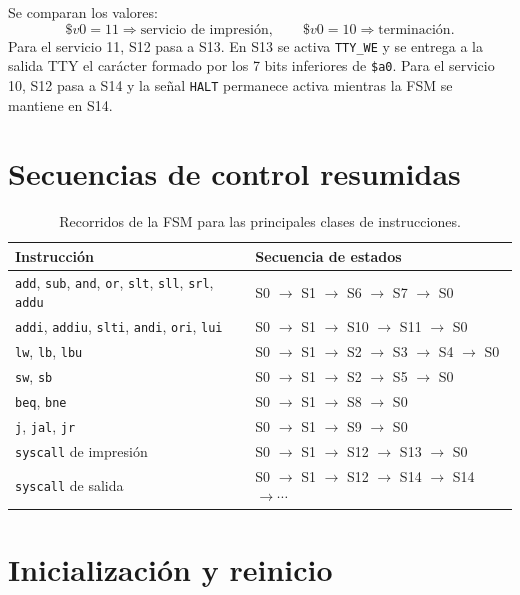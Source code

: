 \documentclass[11pt,a4paper]{article}
\begin{document}
Se comparan los valores:
\[
    \$v0=11 \Rightarrow \text{servicio de impresión},
    \qquad
    \$v0=10 \Rightarrow \text{terminación}.
\]
Para el servicio 11, S12 pasa a S13. En S13 se activa \texttt{TTY\_WE} y se entrega a la salida TTY el carácter formado por los 7 bits inferiores de \texttt{\$a0}. Para el servicio 10, S12 pasa a S14 y la señal \texttt{HALT} permanece activa mientras la FSM se mantiene en S14.

\section{Secuencias de control resumidas}

\begin{table}[H]
    \centering
    \begin{tabularx}{\textwidth}{lX}
        \toprule
        \textbf{Instrucción} & \textbf{Secuencia de estados} \\
        \midrule
        \texttt{add}, \texttt{sub}, \texttt{and}, \texttt{or}, \texttt{slt}, \texttt{sll}, \texttt{srl}, \texttt{addu} & S0 $\to$ S1 $\to$ S6 $\to$ S7 $\to$ S0 \\
        \texttt{addi}, \texttt{addiu}, \texttt{slti}, \texttt{andi}, \texttt{ori}, \texttt{lui} & S0 $\to$ S1 $\to$ S10 $\to$ S11 $\to$ S0 \\
        \texttt{lw}, \texttt{lb}, \texttt{lbu} & S0 $\to$ S1 $\to$ S2 $\to$ S3 $\to$ S4 $\to$ S0 \\
        \texttt{sw}, \texttt{sb} & S0 $\to$ S1 $\to$ S2 $\to$ S5 $\to$ S0 \\
        \texttt{beq}, \texttt{bne} & S0 $\to$ S1 $\to$ S8 $\to$ S0 \\
        \texttt{j}, \texttt{jal}, \texttt{jr} & S0 $\to$ S1 $\to$ S9 $\to$ S0 \\
        \texttt{syscall} de impresión & S0 $\to$ S1 $\to$ S12 $\to$ S13 $\to$ S0 \\
        \texttt{syscall} de salida & S0 $\to$ S1 $\to$ S12 $\to$ S14 $\to$ S14 $\to\cdots$ \\
        \bottomrule
    \end{tabularx}
    \caption{Recorridos de la FSM para las principales clases de instrucciones.}
\end{table}

\section{Inicialización y reinicio}
\end{document}
